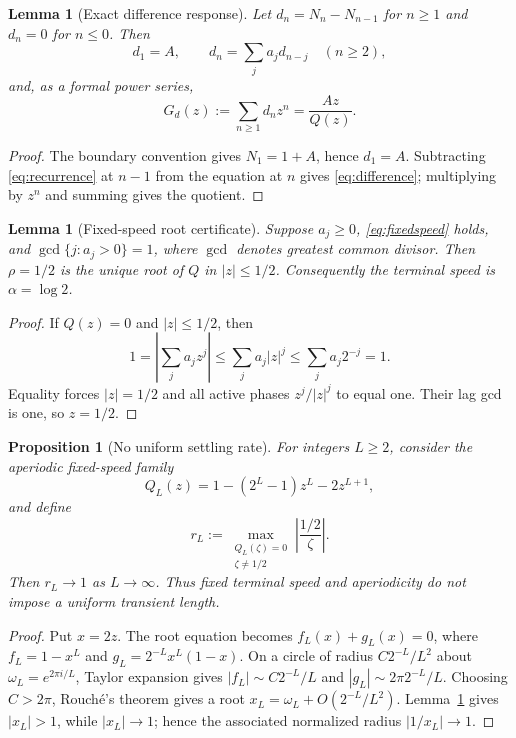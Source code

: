 \documentclass[10pt,twocolumn]{article}
\theoremstyle{cleanprop}
\newtheorem{lemma}[theorem]{Lemma}
\newtheorem{proposition}[theorem]{Proposition}
\begin{document}
\begin{lemma}[Exact difference response]\label{lem:difference}
Let $d_n=N_n-N_{n-1}$ for $n\ge1$ and $d_n=0$ for $n\le0$. Then
\begin{equation}
d_1=A,\qquad d_n=\sum_j a_jd_{n-j}\quad(n\ge2),
\label{eq:difference}
\end{equation}
and, as a formal power series,
\[
G_d(z):=\sum_{n\ge1}d_nz^n=\frac{Az}{Q(z)}.
\]
\end{lemma}
\begin{proof}
The boundary convention gives $N_1=1+A$, hence $d_1=A$.
Subtracting \eqref{eq:recurrence} at $n-1$ from the equation at $n$ gives
\eqref{eq:difference}; multiplying by $z^n$ and summing gives the quotient.
\end{proof}

\begin{lemma}[Fixed-speed root certificate]\label{lem:root}
Suppose $a_j\ge0$, \eqref{eq:fixedspeed} holds, and
$\gcd\{j:a_j>0\}=1$, where $\gcd$ denotes greatest common divisor. Then
$\rho=1/2$ is the unique root of $Q$ in
$|z|\le1/2$. Consequently the terminal speed is $\alpha=\log2$.
\end{lemma}
\begin{proof}
If $Q(z)=0$ and $|z|\le1/2$, then
\[
1=\left|\sum_j a_jz^j\right|
 \le\sum_j a_j|z|^j\le\sum_j a_j2^{-j}=1.
\]
Equality forces $|z|=1/2$ and all active phases $z^j/|z|^j$ to equal one.
Their lag gcd is one, so $z=1/2$.
\end{proof}

\begin{proposition}[No uniform settling rate]\label{prop:slow}
For integers $L\ge2$, consider the aperiodic fixed-speed family
\[
Q_L(z)=1-(2^L-1)z^L-2z^{L+1},
\]
and define
\[
r_L:=\max_{\substack{Q_L(\zeta)=0\\ \zeta\ne1/2}}
\left|\frac{1/2}{\zeta}\right|.
\]
Then $r_L\to1$ as $L\to\infty$. Thus fixed terminal speed and aperiodicity do
not impose a uniform transient length.
\end{proposition}
\begin{proof}
Put $x=2z$. The root equation becomes
$f_L(x)+g_L(x)=0$, where $f_L=1-x^L$ and
$g_L=2^{-L}x^L(1-x)$. On a circle of radius
$C2^{-L}/L^2$ about $\omega_L=e^{2\pi i/L}$, Taylor expansion gives
$|f_L|\sim C2^{-L}/L$ and $|g_L|\sim2\pi2^{-L}/L$.
Choosing $C>2\pi$, Rouch\'e's theorem gives a root
$x_L=\omega_L+O(2^{-L}/L^2)$. Lemma~\ref{lem:root} gives $|x_L|>1$, while
$|x_L|\to1$; hence the associated normalized radius $|1/x_L|\to1$.
\end{proof}
\end{document}
